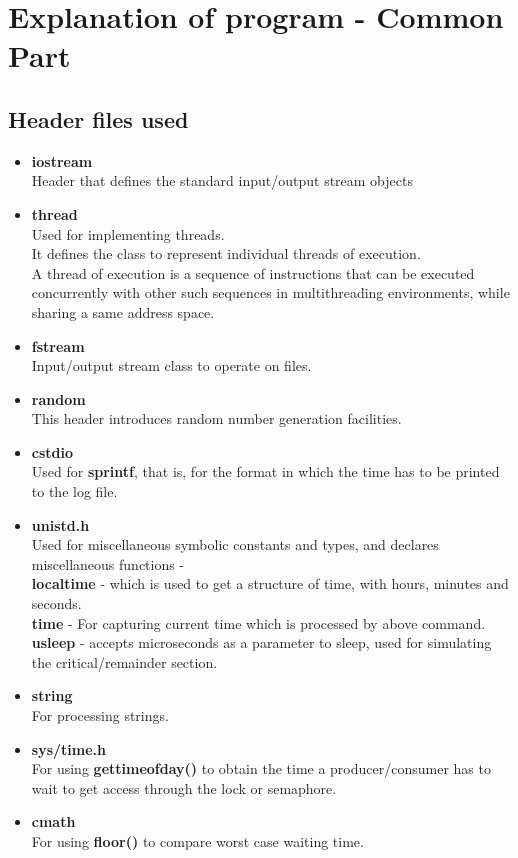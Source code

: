 \documentclass[12pt]{article}
\begin{document}
\section{Explanation of program - Common Part}

\subsection{Header files used}
\begin{itemize}
\item \textbf{iostream}\\
Header that defines the standard input/output stream objects
\item \textbf{thread}\\
Used for implementing threads.\\
It defines the class to represent individual threads of execution.\\
A thread of execution is a sequence of instructions that can be executed concurrently with other such sequences in multithreading environments, while sharing a same address space.\\
\item \textbf{fstream}\\
Input/output stream class to operate on files.
\item \textbf{random}\\
This header introduces random number generation facilities.\\
\item \textbf{cstdio}\\
Used for \textbf{sprintf}, that is, for the format in which the time has to be printed to the log file.
\item \textbf{unistd.h}\\
Used for miscellaneous symbolic constants and types, and declares miscellaneous functions - \\
\textbf{localtime} - which is used to get a structure of time, with hours, minutes and seconds.\\
\textbf{time} - For capturing current time which is processed by above command.\\
\textbf{usleep} - accepts microseconds as a parameter to sleep, used for simulating the critical/remainder section.
\item \textbf{string}\\
For processing strings.
\item \textbf{sys/time.h}\\
For using \textbf{gettimeofday()} to obtain the time a producer/consumer has to wait to get access through the lock or semaphore.
\item \textbf{cmath}\\
For using \textbf{floor()} to compare worst case waiting time.
\end{itemize}
\end{document}
